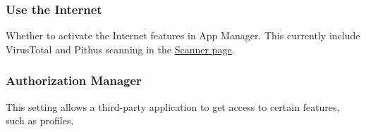 \subsubsection{Use the Internet}\label{subsubsec:use-the-internet} %
Whether to activate the Internet features in App Manager. This currently include VirusTotal and
Pithus scanning in the \hyperref[sec:scanner-page]{Scanner page}.

\subsubsection{Authorization Manager}\label{subsubsec:auth-manager} %
This setting allows a third-party application to get access to certain features, such as profiles.

